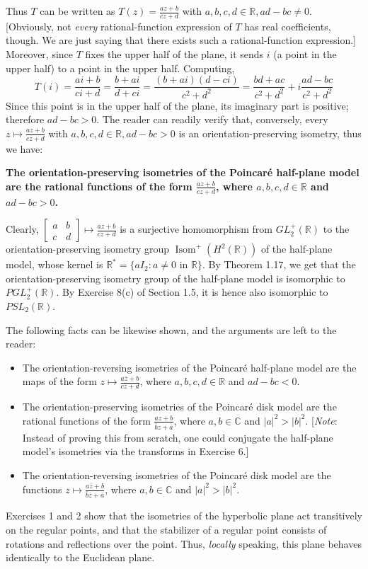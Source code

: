 \documentclass[leqno]{book}
\begin{document}
Thus $T$ can be written as $T(z)=\frac{az+b}{cz+d}$ with $a,b,c,d\in\mathbb R,ad-bc\ne 0$.  [Obviously, not \emph{every} rational-function expression of $T$ has real coefficients, though.  We are just saying that there exists such a rational-function expression.]  Moreover, since $T$ fixes the upper half of the plane, it sends $i$ (a point in the upper half) to a point in the upper half.  Computing,
$$T(i)=\frac{ai+b}{ci+d}=\frac{b+ai}{d+ci}=\frac{(b+ai)(d-ci)}{c^2+d^2}=\frac{bd+ac}{c^2+d^2}+i\frac{ad-bc}{c^2+d^2}$$
Since this point is in the upper half of the plane, its imaginary part is positive; therefore $ad-bc>0$.  The reader can readily verify that, conversely, every $z\mapsto\frac{az+b}{cz+d}$ with $a,b,c,d\in\mathbb R,ad-bc>0$ is an orientation-preserving isometry, thus we have:
\begin{center}
\textbf{The orientation-preserving isometries of the Poincar\'e half-plane model are the rational functions of the form $\frac{az+b}{cz+d}$, where $a,b,c,d\in\mathbb R$ and $ad-bc>0$.}
\end{center}
Clearly, $\begin{bmatrix}a&b\\c&d\end{bmatrix}\mapsto\frac{az+b}{cz+d}$ is a surjective homomorphism from $GL^+_2(\mathbb R)$ to the orientation-preserving isometry group $\operatorname{Isom}^+(H^2(\mathbb R))$ of the half-plane model, whose kernel is $\mathbb R^*=\{aI_2:a\ne 0\text{ in }\mathbb R\}$.  By Theorem 1.17, we get that the orientation-preserving isometry group of the half-plane model is isomorphic to $PGL^+_2(\mathbb R)$.  By Exercise 8(c) of Section 1.5, it is hence also isomorphic to $PSL_2(\mathbb R)$.

The following facts can be likewise shown, and the arguments are left to the reader:
\begin{itemize}
\item The orientation-reversing isometries of the Poincar\'e half-plane model are the maps of the form $z\mapsto\frac{a\overline z+b}{c\overline z+d}$, where $a,b,c,d\in\mathbb R$ and $ad-bc<0$.

\item The orientation-preserving isometries of the Poincar\'e disk model are the rational functions of the form $\frac{az+b}{\overline bz+\overline a}$, where $a,b\in\mathbb C$ and $|a|^2>|b|^2$. [\emph{Note}: Instead of proving this from scratch, one could conjugate the half-plane model's isometries via the transforms in Exercise 6.]

\item The orientation-reversing isometries of the Poincar\'e disk model are the functions $z\mapsto\frac{a\overline z+b}{\overline b\overline z+\overline a}$, where $a,b\in\mathbb C$ and $|a|^2>|b|^2$.
\end{itemize}
\noindent Exercises 1 and 2 show that the isometries of the hyperbolic plane act transitively on the regular points, and that the stabilizer of a regular point consists of rotations and reflections over the point.  Thus, \emph{locally} speaking, this plane behaves identically to the Euclidean plane.\\
\end{document}
